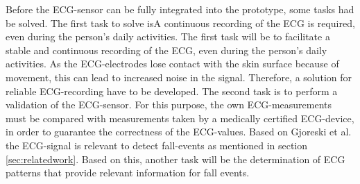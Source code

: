 \documentclass[review]{elsarticle}
\begin{document}
Before the ECG-sensor can be fully integrated into the prototype, some tasks had be solved.  The first task to solve isA continuous recording of the ECG is required, even during the person's daily activities. The first task will be to facilitate a stable and continuous recording of the ECG, even during the person's daily activities. As the ECG-electrodes lose contact with the skin surface because of movement, this can lead to increased noise in the signal. Therefore, a solution for reliable ECG-recording have to be developed. The second task is to perform a validation of the ECG-sensor. For this purpose, the own ECG-measurements must be compared with measurements taken by a medically certified ECG-device, in order to guarantee the correctness of the ECG-values. Based on Gjoreski et al. \cite{Gjoreski2014} the ECG-signal is relevant to detect fall-events as mentioned in section \ref{sec:relatedwork}. Based on this, another task will be the determination of ECG patterns that provide relevant information for fall events.
\end{document}
